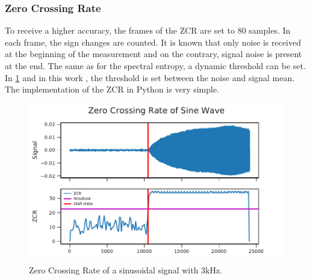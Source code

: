 
\subsubsection*{Zero Crossing Rate}

To receive a higher accuracy, the frames of the \ac{ZCR} are set to 80 samples.
In each frame, the sign changes are counted.
It is known that only noise is received at the beginning of the measurement and on the
contrary, signal noise is present at the end.
The same as for the spectral entropy, a dynamic threshold can be set.
In \cref{fig:03_zcr} and in this work , the threshold is set between the
noise and signal mean.
The implementation of the \ac{ZCR} in Python is very simple.

\begin{figure}[ht]
	\centering
		\includegraphics[]{figures/sine_zcr}
	\caption{Zero Crossing Rate of a sinusoidal signal with 3\si{\kilo\hertz}.}
	\label{fig:03_zcr}
\end{figure}